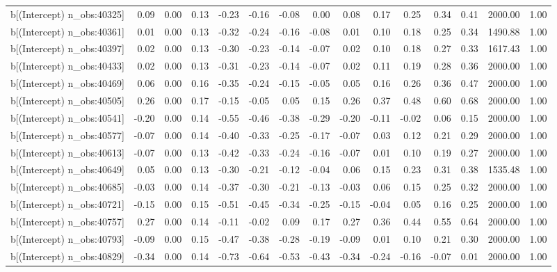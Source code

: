 \begin{table}[ht]
\begin{tabular}{rrrrrrrrrrrrrrr}
  b[(Intercept) n\_obs:40325] & 0.09 & 0.00 & 0.13 & -0.23 & -0.16 & -0.08 & 0.00 & 0.08 & 0.17 & 0.25 & 0.34 & 0.41 & 2000.00 & 1.00 \\ 
  b[(Intercept) n\_obs:40361] & 0.01 & 0.00 & 0.13 & -0.32 & -0.24 & -0.16 & -0.08 & 0.01 & 0.10 & 0.18 & 0.25 & 0.34 & 1490.88 & 1.00 \\ 
  b[(Intercept) n\_obs:40397] & 0.02 & 0.00 & 0.13 & -0.30 & -0.23 & -0.14 & -0.07 & 0.02 & 0.10 & 0.18 & 0.27 & 0.33 & 1617.43 & 1.00 \\ 
  b[(Intercept) n\_obs:40433] & 0.02 & 0.00 & 0.13 & -0.31 & -0.23 & -0.14 & -0.07 & 0.02 & 0.11 & 0.19 & 0.28 & 0.36 & 2000.00 & 1.00 \\ 
  b[(Intercept) n\_obs:40469] & 0.06 & 0.00 & 0.16 & -0.35 & -0.24 & -0.15 & -0.05 & 0.05 & 0.16 & 0.26 & 0.36 & 0.47 & 2000.00 & 1.00 \\ 
  b[(Intercept) n\_obs:40505] & 0.26 & 0.00 & 0.17 & -0.15 & -0.05 & 0.05 & 0.15 & 0.26 & 0.37 & 0.48 & 0.60 & 0.68 & 2000.00 & 1.00 \\ 
  b[(Intercept) n\_obs:40541] & -0.20 & 0.00 & 0.14 & -0.55 & -0.46 & -0.38 & -0.29 & -0.20 & -0.11 & -0.02 & 0.06 & 0.15 & 2000.00 & 1.00 \\ 
  b[(Intercept) n\_obs:40577] & -0.07 & 0.00 & 0.14 & -0.40 & -0.33 & -0.25 & -0.17 & -0.07 & 0.03 & 0.12 & 0.21 & 0.29 & 2000.00 & 1.00 \\ 
  b[(Intercept) n\_obs:40613] & -0.07 & 0.00 & 0.13 & -0.42 & -0.33 & -0.24 & -0.16 & -0.07 & 0.01 & 0.10 & 0.19 & 0.27 & 2000.00 & 1.00 \\ 
  b[(Intercept) n\_obs:40649] & 0.05 & 0.00 & 0.13 & -0.30 & -0.21 & -0.12 & -0.04 & 0.06 & 0.15 & 0.23 & 0.31 & 0.38 & 1535.48 & 1.00 \\ 
  b[(Intercept) n\_obs:40685] & -0.03 & 0.00 & 0.14 & -0.37 & -0.30 & -0.21 & -0.13 & -0.03 & 0.06 & 0.15 & 0.25 & 0.32 & 2000.00 & 1.00 \\ 
  b[(Intercept) n\_obs:40721] & -0.15 & 0.00 & 0.15 & -0.51 & -0.45 & -0.34 & -0.25 & -0.15 & -0.04 & 0.05 & 0.16 & 0.25 & 2000.00 & 1.00 \\ 
  b[(Intercept) n\_obs:40757] & 0.27 & 0.00 & 0.14 & -0.11 & -0.02 & 0.09 & 0.17 & 0.27 & 0.36 & 0.44 & 0.55 & 0.64 & 2000.00 & 1.00 \\ 
  b[(Intercept) n\_obs:40793] & -0.09 & 0.00 & 0.15 & -0.47 & -0.38 & -0.28 & -0.19 & -0.09 & 0.01 & 0.10 & 0.21 & 0.30 & 2000.00 & 1.00 \\ 
  b[(Intercept) n\_obs:40829] & -0.34 & 0.00 & 0.14 & -0.73 & -0.64 & -0.53 & -0.43 & -0.34 & -0.24 & -0.16 & -0.07 & 0.01 & 2000.00 & 1.00 \\ 

\end{tabular}
\end{table}

